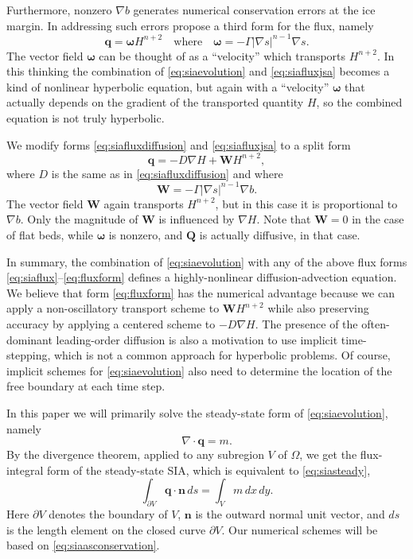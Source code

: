 \documentclass[twocolumn,letterpaper]{igs}
\newcommand\bn{\mathbf{n}}
\newcommand\bq{\mathbf{q}}
\newcommand\bQ{\mathbf{Q}}
\newcommand\bW{\mathbf{W}}
\newcommand{\Div}{\nabla\cdot}
\newcommand{\grad}{\nabla}
\begin{document}
Furthermore, nonzero $\grad b$ generates numerical conservation errors at the ice margin.  In addressing such errors \cite{JaroschSchoofAnslow2013} propose a third form for the flux, namely
\begin{equation}
   \bq = \boldsymbol{\omega} H^{n+2} \quad \text{where} \quad \boldsymbol{\omega} = - \Gamma |\grad s|^{n-1} \grad s. \label{eq:siafluxjsa}
\end{equation}
The vector field $\boldsymbol{\omega}$ can be thought of as a ``velocity'' which transports $H^{n+2}$.  In this thinking the combination of \eqref{eq:siaevolution} and \eqref{eq:siafluxjsa} becomes a kind of nonlinear hyperbolic equation, but again with a ``velocity'' $\boldsymbol{\omega}$ that actually depends on the gradient of the transported quantity $H$, so the combined equation is not truly hyperbolic.

We modify forms \eqref{eq:siafluxdiffusion} and \eqref{eq:siafluxjsa} to a split form
\begin{equation}
\bq = - D \grad H + \bW H^{n+2},\label{eq:fluxform}
\end{equation}
where $D$ is the same as in \eqref{eq:siafluxdiffusion} and where
\begin{equation}
\bW = - \Gamma |\grad s|^{n-1} \grad b.  \label{eq:siaWdefine}
\end{equation}
The vector field $\bW$ again transports $H^{n+2}$, but in this case it is proportional to $\grad b$.  Only the magnitude of $\bW$ is influenced by $\grad H$.  Note that $\bW=0$ in the case of flat beds, while $\boldsymbol{\omega}$ is nonzero, and $\bQ$ is actually diffusive, in that case.

In summary, the combination of \eqref{eq:siaevolution} with any of the above flux forms \eqref{eq:siaflux}--\eqref{eq:fluxform} defines a highly-nonlinear diffusion-advection equation.  We believe that form \eqref{eq:fluxform} has the numerical advantage because we can apply a non-oscillatory transport scheme to $\bW H^{n+2}$ while also preserving accuracy by applying a centered scheme to $-D \grad H$.  The presence of the often-dominant leading-order diffusion is also a motivation to use implicit time-stepping, which is not a common approach for hyperbolic problems.  Of course, implicit schemes for \eqref{eq:siaevolution} also need to determine the location of the free boundary at each time step.

In this paper we will primarily solve the steady-state form of \eqref{eq:siaevolution}, namely
\begin{equation}
\Div \bq = m.  \label{eq:siasteady}
\end{equation}
By the divergence theorem, applied to any subregion $V$ of $\Omega$, we get the flux-integral form of the steady-state SIA, which is equivalent to \eqref{eq:siasteady},
\begin{equation}
  \int_{\partial V} \bq \cdot \bn\,ds = \int_V m\, dx\,dy. \label{eq:siaasconservation}
\end{equation}
Here $\partial V$ denotes the boundary of $V$, $\bn$ is the outward normal unit vector, and $ds$ is the length element on the closed curve $\partial V$.  Our numerical schemes will be based on \eqref{eq:siaasconservation}.
\end{document}
